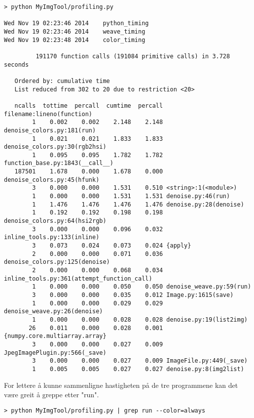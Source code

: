 \documentclass{article}
\begin{document}
\begin{Verbatim}[numbers=none,frame=lines,label=\fbox{{\tiny Terminal}},fontsize=\fontsize{9pt}{9pt},
labelposition=topline,framesep=2.5mm,framerule=0.7pt]
> python MyImgTool/profiling.py

Wed Nov 19 02:23:46 2014    python_timing
Wed Nov 19 02:23:46 2014    weave_timing
Wed Nov 19 02:23:48 2014    color_timing

         191170 function calls (191084 primitive calls) in 3.728 seconds

   Ordered by: cumulative time
   List reduced from 302 to 20 due to restriction <20>

   ncalls  tottime  percall  cumtime  percall filename:lineno(function)
        1    0.002    0.002    2.148    2.148 denoise_colors.py:181(run)
        1    0.021    0.021    1.833    1.833 denoise_colors.py:30(rgb2hsi)
        1    0.095    0.095    1.782    1.782 function_base.py:1843(__call__)
   187501    1.678    0.000    1.678    0.000 denoise_colors.py:45(hfunk)
        3    0.000    0.000    1.531    0.510 <string>:1(<module>)
        1    0.000    0.000    1.531    1.531 denoise.py:46(run)
        1    1.476    1.476    1.476    1.476 denoise.py:28(denoise)
        1    0.192    0.192    0.198    0.198 denoise_colors.py:64(hsi2rgb)
        3    0.000    0.000    0.096    0.032 inline_tools.py:133(inline)
        3    0.073    0.024    0.073    0.024 {apply}
        2    0.000    0.000    0.071    0.036 denoise_colors.py:125(denoise)
        2    0.000    0.000    0.068    0.034 inline_tools.py:361(attempt_function_call)
        1    0.000    0.000    0.050    0.050 denoise_weave.py:59(run)
        3    0.000    0.000    0.035    0.012 Image.py:1615(save)
        1    0.000    0.000    0.029    0.029 denoise_weave.py:26(denoise)
        1    0.000    0.000    0.028    0.028 denoise.py:19(list2img)
       26    0.011    0.000    0.028    0.001 {numpy.core.multiarray.array}
        3    0.000    0.000    0.027    0.009 JpegImagePlugin.py:566(_save)
        3    0.000    0.000    0.027    0.009 ImageFile.py:449(_save)
        1    0.005    0.005    0.027    0.027 denoise.py:8(img2list)
\end{Verbatim}
\noindent


For lettere å kunne sammenligne hastigheten på de tre programmene
kan det være greit å greppe etter "run".

\begin{Verbatim}[numbers=none,frame=lines,label=\fbox{{\tiny Terminal}},fontsize=\fontsize{9pt}{9pt},
labelposition=topline,framesep=2.5mm,framerule=0.7pt]
> python MyImgTool/profiling.py | grep run --color=always
\end{Verbatim}
\noindent
\end{document}
